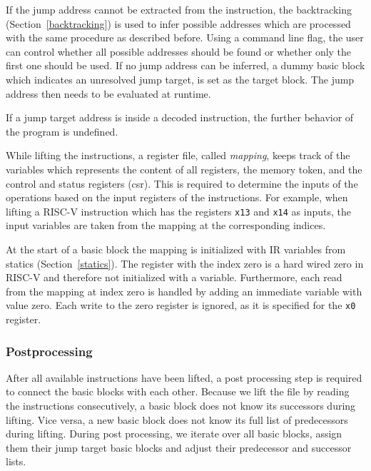 \documentclass[course=eragp]{aspdoc}
\begin{document}
\par

If the jump address cannot be extracted from the instruction, the backtracking (Section~\ref{backtracking})
is used to infer possible addresses which are processed with the same procedure as described before.
Using a command line flag, the user can control whether all possible
addresses should be found or whether only the first one should be used. If no jump address can be inferred, a dummy
basic block which indicates an unresolved jump target, is set as the target block. The jump address then
needs to be evaluated at runtime.
\par

If a jump target address is inside a decoded instruction, the further behavior of the program is undefined.

\par

While lifting the instructions, a register file, called \emph{mapping}, keeps track of the variables
which represents the content of all registers, the memory token, and the control and status registers
(csr). This is required to determine the inputs of the operations based on the input registers of
the instructions. For example, when lifting a RISC-V instruction which has the registers \texttt{x13}
and \texttt{x14} as inputs, the input variables are taken from the mapping at the corresponding
indices.

\par

At the start of a basic block the mapping is initialized
with IR variables from statics (Section~\ref{statics}). The register with the index zero is a hard wired zero in
RISC-V and therefore not initialized with a variable. Furthermore, each read from the mapping at index zero is handled by adding an immediate
variable with value zero. Each write to the zero register is ignored, as it is specified for the \texttt{x0}
register.\cite{rvspec}

\subsubsection{Postprocessing}

After all available instructions have been lifted, a post processing step is required to connect
the basic blocks with each other. Because we lift the file by reading the instructions
consecutively, a basic block does not know its successors during lifting. Vice versa, a new basic
block does not know its full list of predecessors during lifting.
During post processing, we iterate over all basic blocks, assign them their jump target basic
blocks and adjust their predecessor and successor lists.
\end{document}
